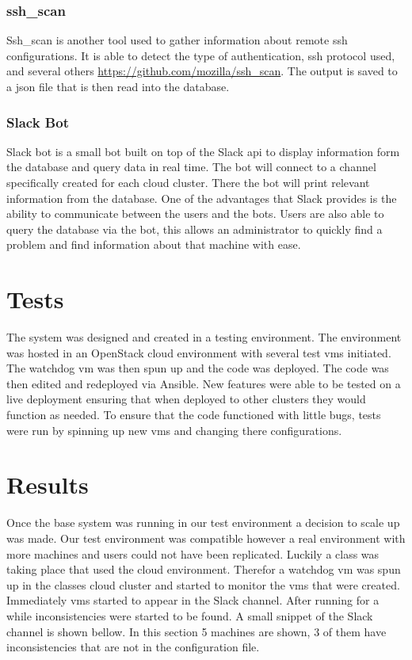 \documentclass[12pt]{article}
\begin{document}
\subsubsection{ssh\_scan}
Ssh\_scan is another tool used to gather information about remote ssh configurations. It is able to detect the type of authentication, ssh protocol used, and several others \href{https://github.com/mozilla/ssh\_scan}{https://github.com/mozilla/ssh\_scan}. The output is saved to a json file that is then read into the database.

\subsubsection{Slack Bot}
Slack bot is a small bot built on top of the Slack api to display information form the database and query data in real time. The bot will connect to a channel specifically created for each cloud cluster. There the bot will print relevant information from the database. One of the advantages that Slack provides is the ability to communicate between the users and the bots. Users are also able to query the database via the bot, this allows an administrator to quickly find a problem and find information about that machine with ease.


\section{Tests}
The system was designed and created in a testing environment. The environment was hosted in an OpenStack cloud environment with several test vms initiated. The watchdog vm was then spun up and the code was deployed. The code was then edited and redeployed via Ansible. New features were able to be tested on a live deployment ensuring that when deployed to other clusters they would function as needed. To ensure that the code functioned with little bugs, tests were run by spinning up new vms and changing there configurations.

\section{Results}
Once the base system was running in our test  environment a decision to scale up was made. Our test environment was compatible however a real environment with more machines and users could not have been replicated. Luckily a class was taking place that used the cloud environment. Therefor a watchdog vm was spun up in the classes cloud cluster and started to monitor the vms that were created. Immediately vms started to appear in the Slack channel. After running for a while inconsistencies were started to be found. A small snippet of the Slack channel is shown bellow. In this section 5 machines are shown, 3 of them have inconsistencies that are not in the configuration file.
\end{document}
